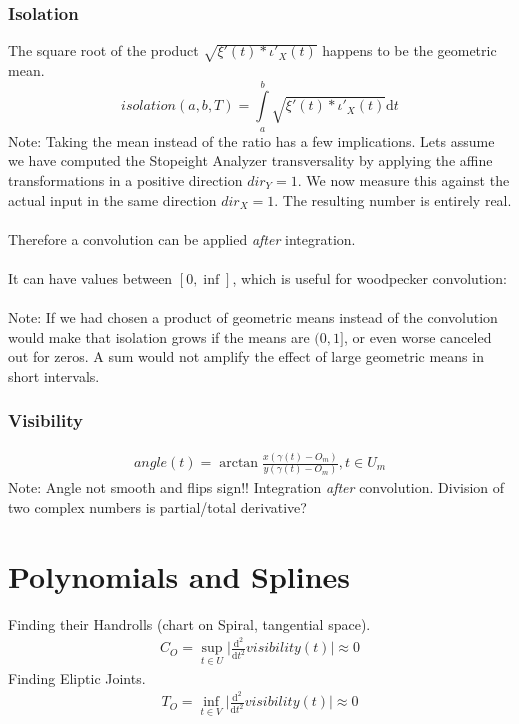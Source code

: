 \documentclass{report}
\begin{document}
\subsection{Isolation}
The square root of the product $\sqrt{\xi'(t)*\iota'_{X}(t)}$ happens to be the geometric mean.
\begin{equation}
isolation(a,b,T)=\int \limits _{a}^{b} \sqrt{\xi'(t)*\iota'_{X}(t)} \mathrm{d}t
\end{equation}
Note: Taking the mean instead of the ratio has a few implications. Lets assume we have computed the Stopeight Analyzer transversality by applying the affine transformations in a positive direction $dir_{Y}=1$. We now measure this against the actual input in the same direction $dir_{X}=1$. The resulting number is entirely real.\\\\
Therefore a convolution can be applied \emph{after} integration.\\\\
It can have values between $[0,\inf]$, which is useful for woodpecker convolution:\\\\
Note: If we had chosen a product of geometric means instead of the convolution would make that isolation grows if the means are $(0,1]$, or even worse canceled out for zeros. A sum would not amplify the effect of large geometric means in short intervals.

\subsection{Visibility}
\begin{align}
angle(t)=\arctan\frac{x(\gamma(t)-O_{m})}{y(\gamma(t)-O_{m})},t \in U_{m}
\end{align}
Note: Angle not smooth and flips sign!! Integration \emph{after} convolution. Division of two complex numbers is partial/total derivative?

\chapter{Polynomials and Splines}
Finding their Handrolls (chart on Spiral, tangential space).
\begin{align}
C_{O}=\sup_{t \in U} \lvert \frac{\mathrm{d}^2}{\mathrm{d}t^2}visibility(t) \rvert \approx 0
\end{align}
Finding Eliptic Joints.\\
\begin{align}
T_{O}=\inf_{t \in V} \lvert \frac{\mathrm{d}^2}{\mathrm{d}t^2}visibility(t) \rvert \approx 0
\end{align}

\iffalse
\printbibliography
\fi
{}

\end{document}
